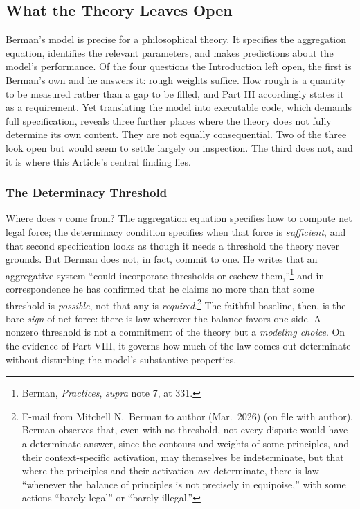 \subsection{What the Theory Leaves Open}

Berman's model is precise for a philosophical theory. It specifies the
aggregation equation, identifies the relevant parameters, and makes
predictions about the model's performance. Of the four questions the
Introduction left open, the first is Berman's own and he answers it: rough
weights suffice. How rough is a quantity to be measured rather than a gap to
be filled, and Part III accordingly states it as a requirement. Yet
translating the model into executable code, which demands full
specification, reveals three further places where the theory does not fully
determine its own content. They are not equally consequential. Two of the three look open but would seem to settle largely on inspection.
The third does not, and it is where this Article's central finding lies.

\subsubsection{The Determinacy Threshold}

Where does $\tau$ come from? The aggregation equation specifies how to compute
net legal force; the determinacy condition specifies when that force is
\textit{sufficient}, and that second specification looks as though it needs a
threshold the theory never grounds. But Berman does not, in fact, commit
to one. He writes that an aggregative system ``could incorporate
thresholds or eschew them,''\footnote{Berman, \textit{Practices}, \textit{supra} note 7, at 331.} and in correspondence he
has confirmed that he claims no more than that some threshold is
\textit{possible}, not that any is \textit{required}.\footnote{E-mail from
Mitchell N.\ Berman to author (Mar.\ 2026) (on file with author). Berman
observes that, even with no threshold, not every dispute would have a
determinate answer, since the contours and weights of some principles, and
their context-specific activation, may themselves be indeterminate, but
that where the principles and their activation \textit{are} determinate,
there is law ``whenever the balance of principles is not precisely in
equipoise,'' with some actions ``barely legal'' or ``barely illegal.''}
The faithful baseline, then, is the bare \textit{sign} of net force: there
is law wherever the balance favors one side. A nonzero threshold is not a commitment of the theory but a
\textit{modeling choice}. On the evidence of Part VIII, it governs how much
of the law comes out determinate without disturbing the model's substantive
properties.

